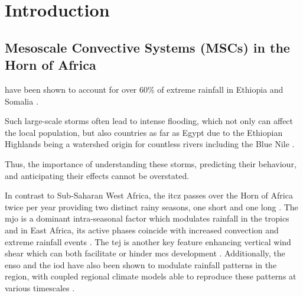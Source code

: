\chapter{Introduction}
\label{ch:intro}

\section{Mesoscale Convective Systems (MSCs) in the Horn of Africa}

 have been shown to account for over 60\% of extreme rainfall in Ethiopia and Somalia \citep{Hill2023}.  

Such large-scale storms often lead to intense flooding, which not only can affect the local population, but also countries as far as Egypt due to the Ethiopian Highlands being a watershed origin for countless rivers including the Blue Nile \citep{Legese2020,Zaroug2014}. 

Thus, the importance of understanding these storms, predicting their behaviour, and anticipating their effects cannot be overstated. 


In contrast to Sub-Saharan West Africa, the \acrfull{itcz} passes over the Horn of Africa twice per year providing two distinct rainy seasons, one short and one long \citep{Palmer2023,Tefera2025}. The \acrfull{mjo} is a dominant intra-seasonal factor which modulates rainfall in the tropics and in East Africa, its active phases coincide with increased convection and extreme rainfall events \citep{Camberlin2019,Ochieng2023,Pohl2006}.  The \acrfull{tej} is another key feature enhancing vertical wind shear which can both facilitate or hinder \acrshort{mcs} development \citep{Farnsworth2011,Vashisht2021}. Additionally, the \acrfull{enso} and the \acrfull{iod} have also been shown to modulate rainfall patterns in the region, with coupled regional climate models able to reproduce these patterns at various timescales \citep{Dubache2019,Endris2019,Vashisht2021,Zaroug2014}. 

